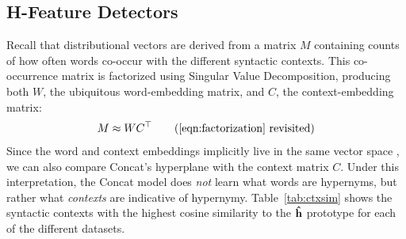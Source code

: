 \subsection{H-Feature Detectors}
\label{sec:ctxsim}

Recall that distributional vectors are derived from a matrix $M$ containing
counts of how often words co-occur with the different syntactic contexts. This
co-occurrence matrix is factorized using Singular Value Decomposition,
producing both $W$, the ubiquitous word-embedding matrix, and $C$, the
context-embedding matrix:
\begin{equation}
  M \approx WC^{\top}
  \tag{\ref{eqn:factorization} revisited}
\end{equation}
Since the word and context embeddings implicitly live in the same vector space
\cite{melamud:2015:vsm}, we can also compare Concat's hyperplane with the
context matrix $C$. Under this interpretation, the Concat model does {\em not}
learn what words are hypernyms, but rather what {\em contexts} are indicative
of hypernymy. Table~\ref{tab:ctxsim} shows the syntactic contexts with the
highest cosine similarity to the ${\mathbf{\hat h}}$ prototype for each of the different
datasets.

